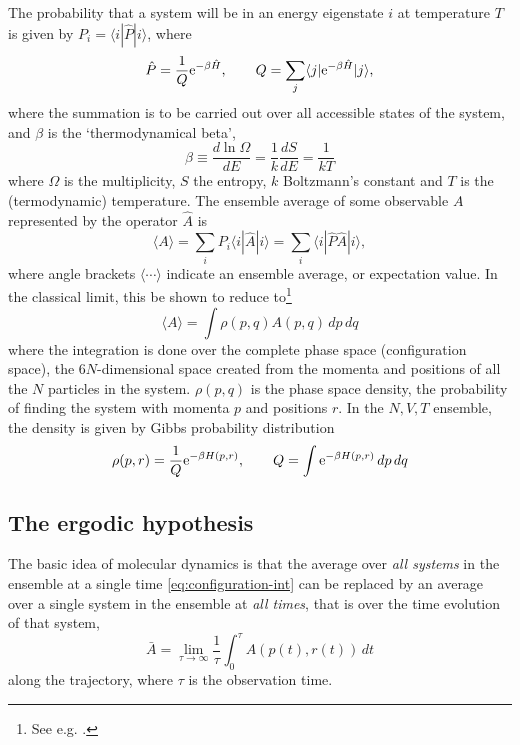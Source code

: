 \documentclass[11pt,bibliography=totoc,index=totoc]{scrbook}   %
\begin{document}
The probability that a system will be in an energy eigenstate $i$ at temperature $T$ is 
given by $P_i=\langle i | \hat{P} | i \rangle$, where
\begin{equation}
  \hat{P} = \frac{1}{Q} \mathrm{e}^{-\beta\hat{H}}, \qquad Q = \sum_j \langle j | \mathrm{e}^{-\beta\hat{H}} | j \rangle,
\end{equation}
where the summation is to be carried out over all accessible states of the system, and
$\beta$ is the `thermodynamical beta',
\begin{equation}
  \beta \equiv \frac{d\ln\Omega}{dE} = \frac{1}{k}\frac{dS}{dE} = \frac{1}{kT}
\end{equation}
where $\Omega$ is the multiplicity, $S$ the entropy, $k$ Boltzmann's constant and $T$ is the (termodynamic) temperature. 
The ensemble average of some observable $A$ represented by the operator $\hat{A}$ is
\begin{equation}
  \langle A \rangle = \sum_i P_i \langle i | \hat{A} | i\rangle = \sum_i \langle i | \hat{P} \hat{A} | i \rangle,
\end{equation}
where angle brackets $\langle \cdots \rangle$ indicate an ensemble average, or expectation value.
In the classical limit, this be shown to reduce to\footnote{See e.g. \cite[13-15]{Frenkel:1996}.}
\begin{equation}
  \langle A \rangle = \int \rho(p,q) A(p,q)\,dp\,dq 
  \label{eq:configuration-int}
\end{equation}
where the integration is done over the complete phase space (configuration space), the $6N$-dimensional space created from the momenta and positions of all the $N$ particles in the system. $\rho(p,q)$ is the phase space density, the probability of finding the system with momenta $p$ and positions $r$. In the $N,V,T$ ensemble, the density is given by Gibbs probability distribution
\begin{equation}
  \rho(p,r) = \frac{1}{Q} \mathrm{e}^{-\beta H(p,r)},\qquad Q = \int \mathrm{e}^{-\beta H(p,r)} \,dp\,dq
\end{equation}

%
\subsection{The ergodic hypothesis}
%

The basic idea of molecular dynamics is that the average over \emph{all systems} in the ensemble at a single time \eqref{eq:configuration-int} can be replaced by an average over a single system in the ensemble at \emph{all times}, that is over the time evolution of that system,
\begin{equation}
  \bar{A} = \lim_{\tau\to\infty} \frac{1}{\tau}\int_{0}^{\tau} A(p(t),r(t)) \,dt
  \label{eq:time-integral}
\end{equation}
along the trajectory, where $\tau$ is the observation time. 
\end{document}
